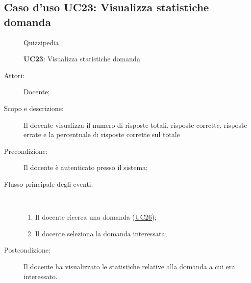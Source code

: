 \subsection{Caso d'uso UC23: Visualizza statistiche domanda}
	\begin{figure}[H]
		\centering
		\begin{resizedtikzpicture}{\textwidth}
		\begin{umlsystem}[x=0, fill=lightgray!20]{Quizzipedia}
		\end{umlsystem}
		\end{resizedtikzpicture}
		\caption{\textbf{UC23}: Visualizza statistiche domanda}
		\label{UC23}
	\end{figure}
\begin{description}
\item[Attori:] Docente;
\item[Scopo e descrizione:] Il docente visualizza il numero di risposte totali, risposte corrette, risposte errate e la percentuale di risposte corrette sul totale
      \item[Precondizione:] Il docente è autenticato presso il sistema;

        \item[Flusso principale degli eventi:] \ 
 \begin{enumerate}
          \item Il docente ricerca una domanda (\hyperlink{UC26}{UC26});
          \item Il docente seleziona la domanda interessata;

      \end{enumerate}
    \item[Postcondizione:] Il docente ha visualizzato le statistiche relative alla domanda a cui era interessato.
  \end{description}
\hypertarget{UC24}{}
